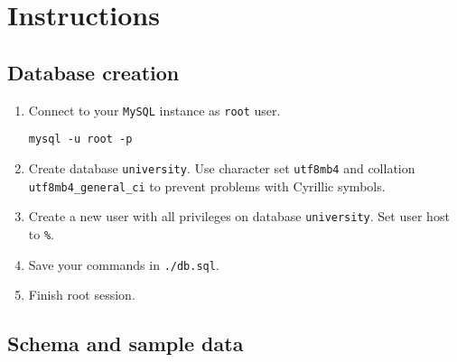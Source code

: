 \documentclass[12pt]{article}
\newcommand{\code}[1]{\texttt{#1}}
\begin{document}
\section*{Instructions}
\subsection*{Database creation}

\begin{enumerate}
\item Connect to your \code{MySQL} instance as \code{root} user.
\begin{verbatim}
mysql -u root -p
\end{verbatim}
\item Create database \code{university}. Use character set \code{utf8mb4} and collation \code{utf8mb4\_general\_ci} to prevent problems with Cyrillic symbols.
\item Create a new user with all privileges on database \code{university}. Set user host to \code{\%}.
\item Save your commands in \code{./db.sql}.
\item Finish root session.
\end{enumerate}

\subsection*{Schema and sample data}
\end{document}
